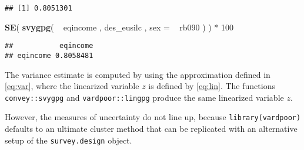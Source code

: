 \documentclass[]{book}
\newenvironment{Shaded}{\begin{snugshade}}{\end{snugshade}}
\newcommand{\KeywordTok}[1]{\textcolor[rgb]{0.13,0.29,0.53}{\textbf{{#1}}}}
\newcommand{\DataTypeTok}[1]{\textcolor[rgb]{0.13,0.29,0.53}{{#1}}}
\newcommand{\DecValTok}[1]{\textcolor[rgb]{0.00,0.00,0.81}{{#1}}}
\newcommand{\StringTok}[1]{\textcolor[rgb]{0.31,0.60,0.02}{{#1}}}
\newcommand{\NormalTok}[1]{{#1}}
\begin{document}
\begin{verbatim}
## [1] 0.8051301
\end{verbatim}

\begin{Shaded}
\begin{Highlighting}[]
\KeywordTok{SE}\NormalTok{( }\KeywordTok{svygpg}\NormalTok{( ~}\StringTok{ }\NormalTok{eqincome , des_eusilc , }\DataTypeTok{sex =} \NormalTok{~}\StringTok{ }\NormalTok{rb090 ) ) *}\StringTok{ }\DecValTok{100}
\end{Highlighting}
\end{Shaded}

\begin{verbatim}
##           eqincome
## eqincome 0.8058481
\end{verbatim}

The variance estimate is computed by using the approximation defined in
\eqref{eq:var}, where the linearized variable \(z\) is defined by
\eqref{eq:lin}. The functions \texttt{convey::svygpg} and
\texttt{vardpoor::lingpg} produce the same linearized variable \(z\).

However, the measures of uncertainty do not line up, because
\texttt{library(vardpoor)} defaults to an ultimate cluster method that
can be replicated with an alternative setup of the
\texttt{survey.design} object.
\end{document}
